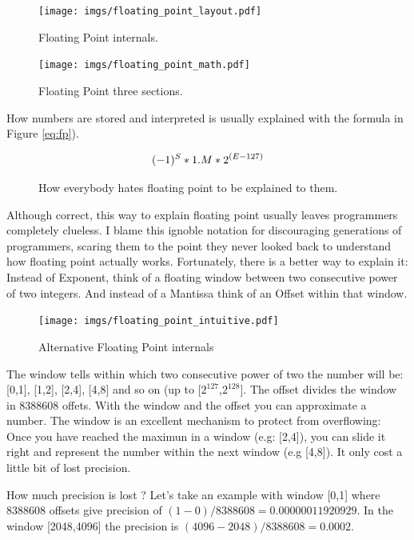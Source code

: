 \documentclass[book.tex]{subfiles}
\begin{document}
\begin{figure}[H]
\centering
\texttt{[image: imgs/floating\_point\_layout.pdf]}
\caption{Floating Point internals.}
\end{figure}
  \bigskip



\begin{figure}[H]
\centering
\texttt{[image: imgs/floating\_point\_math.pdf]}
\caption{Floating Point three sections.}
\end{figure}
  \bigskip  


How numbers are stored and interpreted is usually explained with the formula in Figure \ref{eq:fp}).\

\begin{figure}[H]
\begin{equation}\label{eq:fp}
\large
(-1)^S * 1.M * 2^{(E-127)}
\end{equation}
 \caption{How everybody hates floating point to be explained to them.}
\end{figure}
\bigskip  

Although correct, this way to explain floating point usually leaves programmers completely clueless. I blame this ignoble notation for discouraging generations of programmers, scaring them to the point they never looked back to understand how floating point actually works. Fortunately, there is a better way to explain it: Instead of Exponent, think of a floating window between two consecutive power of two integers. And instead of a Mantissa think of an Offset within that window.\\ 
\par
  
\begin{figure}[H]
\centering
\texttt{[image: imgs/floating\_point\_intuitive.pdf]}
\caption{Alternative Floating Point internals}
\label{fig:fp_internals}
\end{figure}
  \bigskip  
The window tells within which two consecutive power of two the number will be: [0,1], [1,2], [2,4], [4,8] and so on (up to [$2^{127}$,$2^{128}$]. The offset divides the window in 8388608 offets. With the window and the offset you can approximate a number. The window is an excellent mechanism to protect from overflowing: Once you have reached the maximun in a window (e.g: [2,4]), you can slide it right and represent the number within the next window (e.g [4,8]). It only cost a little bit of lost precision.\\
\par {} How much precision is lost ? Let's take an example with window [0,1] where 8388608 offsets give precision of $(1-0)/8388608=0.00000011920929$. In the window [2048,4096] the precision is $ (4096-2048)/8388608=0.0002$.\\
\par
\end{document}
